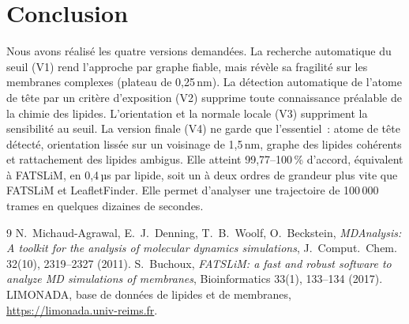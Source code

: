 \documentclass[11pt,a4paper]{article}
\begin{document}
\section*{Conclusion}
Nous avons réalisé les quatre versions demandées. La recherche automatique du seuil (V1) rend l'approche par
graphe fiable, mais révèle sa fragilité sur les membranes complexes (plateau de 0,25\,nm). La détection
automatique de l'atome de tête par un critère d'exposition (V2) supprime toute connaissance préalable de la chimie
des lipides. L'orientation et la normale locale (V3) suppriment la sensibilité au seuil. La version finale (V4) ne
garde que l'essentiel~: atome de tête détecté, orientation lissée sur un voisinage de 1,5\,nm, graphe des lipides
cohérents et rattachement des lipides ambigus. Elle atteint 99,77--100\,\% d'accord, équivalent à FATSLiM, en
0,4\,µs par lipide, soit un à deux ordres de grandeur plus vite que FATSLiM et LeafletFinder. Elle permet
d'analyser une trajectoire de 100\,000 trames en quelques dizaines de secondes.

\begin{thebibliography}{9}
 N.~Michaud-Agrawal, E.~J.~Denning, T.~B.~Woolf, O.~Beckstein, \emph{MDAnalysis: A toolkit for the
analysis of molecular dynamics simulations}, J.~Comput.~Chem. 32(10), 2319--2327 (2011).
 S.~Buchoux, \emph{FATSLiM: a fast and robust software to analyze MD simulations of membranes},
Bioinformatics 33(1), 133--134 (2017).
 LIMONADA, base de données de lipides et de membranes, \url{https://limonada.univ-reims.fr}.
\end{thebibliography}

\end{document}

